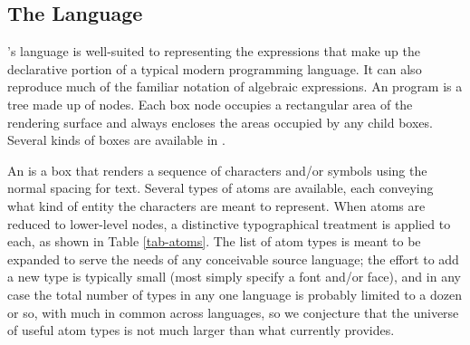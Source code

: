 \subsection{The  Language}

\Meta's  language is well-suited to representing the expressions that make up the declarative portion of a typical modern programming language. It can also reproduce much of the familiar notation of algebraic expressions. An  program is a tree made up of  nodes. Each box node occupies a rectangular area of the rendering surface and always encloses the areas occupied by any child boxes. Several kinds of boxes are available in .

An  is a box that renders a sequence of characters and/or symbols using the normal spacing for text. Several types of atoms are available, each conveying what kind of entity the characters are meant to represent. When atoms are reduced to lower-level nodes, a distinctive typographical treatment is applied to each, as shown in Table \ref{tab-atoms}. The list of atom types is meant to be expanded to serve the needs of any conceivable source language; the effort to add a new type is typically small (most simply specify a font and/or face), and in any case the total number of types in any one language is probably limited to a dozen or so, with much in common across languages, so we conjecture that the universe of useful atom types is not much larger than what  currently provides. 


